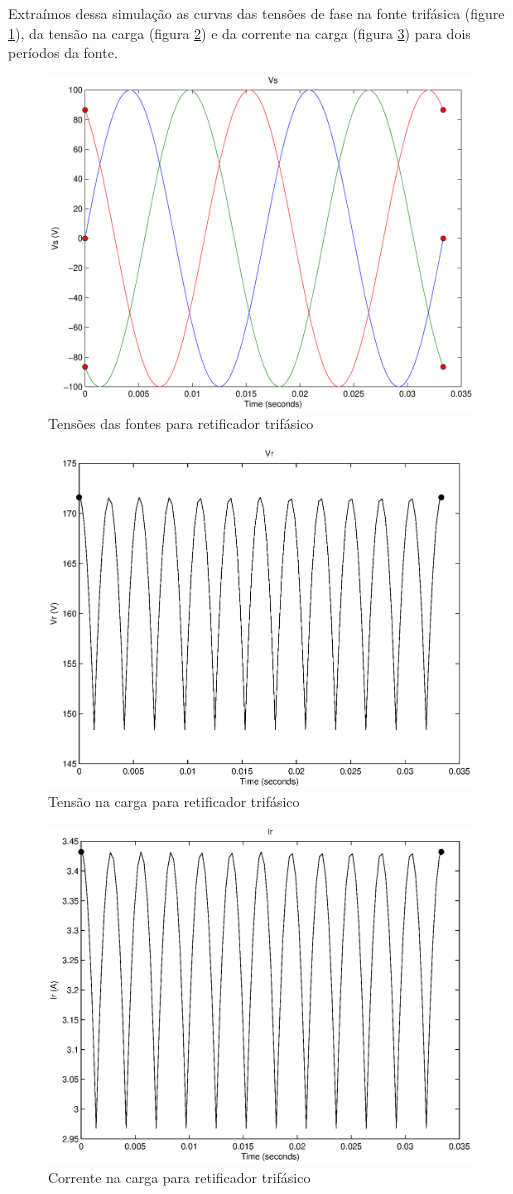\documentclass{report}
\begin{document}
{{Extraímos dessa simulação as curvas das tensões de fase na fonte trifásica (figure \ref{fig:tvs}), da tensão na carga (figura \ref{fig:tvr}) e da corrente na carga (figura \ref{fig:tir}) para dois períodos da fonte.
\begin{figure}[H]
	\centering
	\includegraphics[width=0.7\linewidth]{matlab/tri_vs}
	\caption{Tensões das fontes para retificador trifásico}
	\label{fig:tvs}
\end{figure}
\begin{figure}[H]
	\centering
	\includegraphics[width=0.7\linewidth]{matlab/tri_vr}
	\caption{Tensão na carga para retificador trifásico}
	\label{fig:tvr}
\end{figure}
\begin{figure}[H]
	\centering
	\includegraphics[width=0.7\linewidth]{matlab/tri_ir}
	\caption{Corrente na carga para retificador trifásico}
	\label{fig:tir}
\end{figure}

}}
\end{document}
